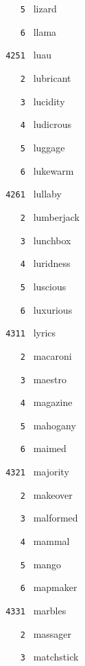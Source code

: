 \documentclass[11pt]{article}
\begin{document}
\begin{multicols}{6}
\noindent \texttt{ \ \ \ 5 } lizard  \par
\noindent \texttt{ \ \ \ 6 } llama  \par
\vspace{3mm}
\noindent \texttt{ 4251 } luau  \par
\noindent \texttt{ \ \ \ 2 } lubricant  \par
\noindent \texttt{ \ \ \ 3 } lucidity  \par
\noindent \texttt{ \ \ \ 4 } ludicrous  \par
\noindent \texttt{ \ \ \ 5 } luggage  \par
\noindent \texttt{ \ \ \ 6 } lukewarm  \par
\vspace{3mm}
\noindent \texttt{ 4261 } lullaby  \par
\noindent \texttt{ \ \ \ 2 } lumberjack  \par
\noindent \texttt{ \ \ \ 3 } lunchbox  \par
\noindent \texttt{ \ \ \ 4 } luridness  \par
\noindent \texttt{ \ \ \ 5 } luscious  \par
\noindent \texttt{ \ \ \ 6 } luxurious  \par
\noindent \texttt{ 4311 } lyrics  \par
\noindent \texttt{ \ \ \ 2 } macaroni  \par
\noindent \texttt{ \ \ \ 3 } maestro  \par
\noindent \texttt{ \ \ \ 4 } magazine  \par
\noindent \texttt{ \ \ \ 5 } mahogany  \par
\noindent \texttt{ \ \ \ 6 } maimed  \par
\vspace{3mm}
\noindent \texttt{ 4321 } majority  \par
\noindent \texttt{ \ \ \ 2 } makeover  \par
\noindent \texttt{ \ \ \ 3 } malformed  \par
\noindent \texttt{ \ \ \ 4 } mammal  \par
\noindent \texttt{ \ \ \ 5 } mango  \par
\noindent \texttt{ \ \ \ 6 } mapmaker  \par
\vspace{3mm}
\noindent \texttt{ 4331 } marbles  \par
\noindent \texttt{ \ \ \ 2 } massager  \par
\noindent \texttt{ \ \ \ 3 } matchstick  \par

\end{multicols}
\end{document}
